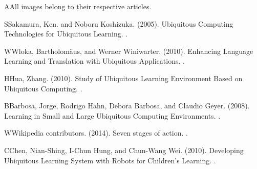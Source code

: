 \documentclass[twoside]{article}
\begin{document}
\begin{multicols}{2}
\begin{thebibliography}{99}
\bibitem AAll images belong to their respective articles.

\bibitem SSakamura, Ken. and Noboru Koshizuka. (2005).
\newblock Ubiquitous Computing Technologies for Ubiquitous Learning.
.

\bibitem WWloka, Bartholomäus, and Werner Winiwarter. (2010).
\newblock Enhancing Language Learning and Translation with Ubiquitous Applications.
.

\bibitem HHua, Zhang. (2010).
\newblock Study of Ubiquitous Learning Environment Based on Ubiquitous Computing.
.

\bibitem BBarbosa, Jorge, Rodrigo Hahn, Debora Barbosa, and Claudio Geyer. (2008).
\newblock Learning in Small and Large Ubiquitous Computing Environments.
.

\bibitem WWikipedia contributors. (2014).
\newblock Seven stages of action.
.

\bibitem CChen, Nian-Shing, I-Chun Hung, and Chun-Wang Wei. (2010).
\newblock Developing Ubiquitous Learning System with Robots for Children's Learning.
.
 
\end{thebibliography}


\end{multicols}
\end{document}

